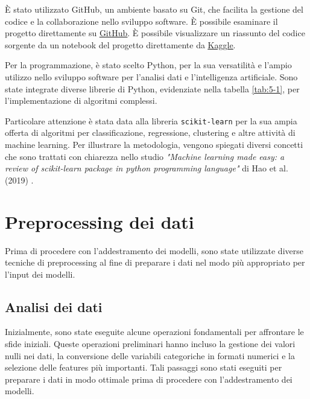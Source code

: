 \bigskip

È stato utilizzato GitHub, un ambiente basato su Git, che facilita la gestione del codice e la collaborazione nello sviluppo software. È possibile esaminare il progetto direttamente su \href{https://github.com/robertovicario/BSc-Computer-Science-Thesis.git}{\underline{GitHub}}. È possibile visualizzare un riassunto del codice sorgente da un notebook del progetto direttamente da \href{https://www.kaggle.com/code/robertovicario/swell-kw-stress-detection}{\underline{Kaggle}}.

\bigskip

Per la programmazione, è stato scelto Python, per la sua versatilità e l'ampio utilizzo nello sviluppo software per l'analisi dati e l'intelligenza artificiale. Sono state integrate diverse librerie di Python, evidenziate nella tabella \ref{tab:5-1}, per l'implementazione di algoritmi complessi.

\bigskip

Particolare attenzione è stata data alla libreria \texttt{scikit-learn} per la sua ampia offerta di algoritmi per classificazione, regressione, clustering e altre attività di machine learning. Per illustrare la metodologia, vengono spiegati diversi concetti che sono trattati con chiarezza nello studio \textit{"Machine learning made easy: a review of scikit-learn package in python programming language"} di Hao et al. (2019) \cite{hao2019machine}.

\section{Preprocessing dei dati}

Prima di procedere con l'addestramento dei modelli, sono state utilizzate diverse tecniche di preprocessing al fine di preparare i dati nel modo più appropriato per l'input dei modelli.

\subsection{Analisi dei dati}

Inizialmente, sono state eseguite alcune operazioni fondamentali per affrontare le sfide iniziali. Queste operazioni preliminari hanno incluso la gestione dei valori nulli nei dati, la conversione delle variabili categoriche in formati numerici e la selezione delle features più importanti. Tali passaggi sono stati eseguiti per preparare i dati in modo ottimale prima di procedere con l'addestramento dei modelli.

